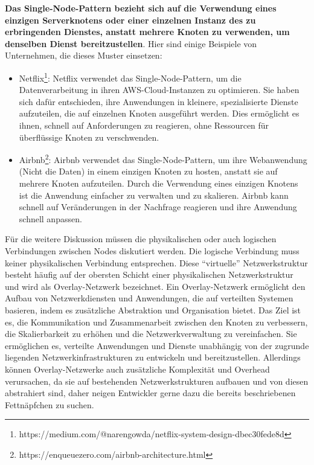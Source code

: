 \textbf{Das Single-Node-Pattern bezieht sich auf die Verwendung eines einzigen Serverknotens oder einer einzelnen Instanz des zu erbringenden Dienstes, anstatt mehrere Knoten zu verwenden, um denselben Dienst bereitzustellen}. Hier sind einige Beispiele von Unternehmen, die dieses Muster einsetzen:
\begin{itemize}
\item Netflix\footnote{https://medium.com/@narengowda/netflix-system-design-dbec30fede8d}: Netflix verwendet das Single-Node-Pattern, um die Datenverarbeitung in ihren AWS-Cloud-Instanzen zu optimieren. Sie haben sich dafür entschieden, ihre Anwendungen in kleinere, spezialisierte Dienste aufzuteilen, die auf einzelnen Knoten ausgeführt werden. Dies ermöglicht es ihnen, schnell auf Anforderungen zu reagieren, ohne Ressourcen für überflüssige Knoten zu verschwenden.
\item Airbnb\footnote{https://enqueuezero.com/airbnb-architecture.html}: Airbnb verwendet das Single-Node-Pattern, um ihre Webanwendung (Nicht die Daten) in einem einzigen Knoten zu hosten, anstatt sie auf mehrere Knoten aufzuteilen. Durch die Verwendung eines einzigen Knotens ist die Anwendung einfacher zu verwalten und zu skalieren. Airbnb kann schnell auf Veränderungen in der Nachfrage reagieren und ihre Anwendung schnell anpassen.
\end{itemize}

Für die weitere Diskussion müssen die physikalischen oder auch logischen Verbindungen zwischen Nodes diskutiert werden. Die logische Verbindung muss keiner physikalischen Verbindung entsprechen. Diese \enquote{virtuelle} Netzwerkstruktur besteht häufig auf der obersten Schicht einer physikalischen Netzwerkstruktur und wird als Overlay-Netzwerk bezeichnet. Ein Overlay-Netzwerk ermöglicht den Aufbau von Netzwerkdiensten und Anwendungen, die auf verteilten Systemen basieren, indem es zusätzliche Abstraktion und Organisation bietet. Das Ziel ist es, die Kommunikation und Zusammenarbeit zwischen den Knoten zu verbessern, die Skalierbarkeit zu erhöhen und die Netzwerkverwaltung zu vereinfachen. Sie ermöglichen es, verteilte Anwendungen und Dienste unabhängig von der zugrunde liegenden Netzwerkinfrastrukturen zu entwickeln und bereitzustellen. Allerdings können Overlay-Netzwerke auch zusätzliche Komplexität und Overhead verursachen, da sie auf bestehenden Netzwerkstrukturen aufbauen und von diesen abstrahiert sind, daher neigen Entwickler gerne dazu die bereits beschriebenen Fettnäpfchen zu suchen.

